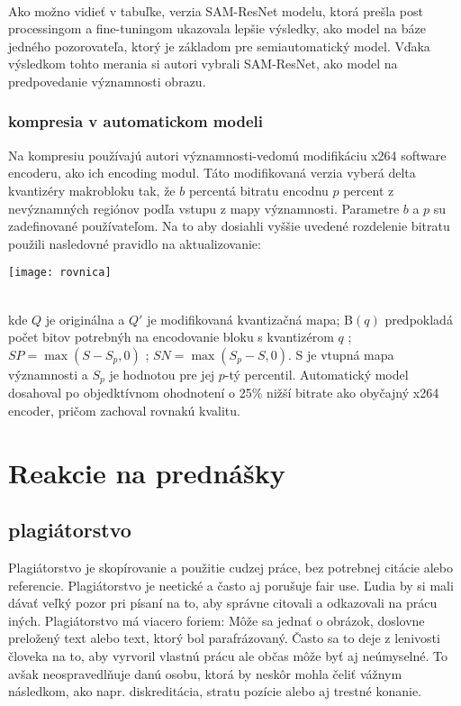 \documentclass[10pt,twoside,slovak,a4paper]{article}
\begin{document}
\\
Ako možno vidieť v tabuľke, verzia SAM-ResNet modelu, ktorá prešla post processingom a fine-tuningom ukazovala lepšie výsledky, ako model na báze jedného pozorovateľa, ktorý je základom pre semiautomatický model. Vďaka výsledkom tohto merania si autori\cite{Czarnecki:Progress} vybrali SAM-ResNet, ako model na predpovedanie významnosti obrazu.
\subsubsection{kompresia v automatickom modeli}
Na kompresiu používajú autori\cite{Czarnecki:Progress} významnosti-vedomú modifikáciu x264 software encoderu, ako ich encoding modul. Táto modifikovaná verzia vyberá delta kvantizéry makrobloku tak, že \(b\) percentá bitratu encodnu \(p\) percent z nevýznamných regiónov podľa vstupu z mapy významnosti. Parametre \(b\) a \(p\) su zadefinované používateľom. Na to aby dosiahli vyššie uvedené rozdelenie bitratu použili nasledovné pravidlo na aktualizovanie:
\begin{figure*}[tbh]
\centering
\texttt{[image: rovnica]}
\label{f:rovnica}
\end{figure*}
\\
kde \(Q\) je originálna a \({Q}'\) je modifikovaná kvantizačná mapa; B\((q)\) predpokladá počet bitov potrebnýh na encodovanie bloku s kvantizérom \(q\) ; \(SP = \max(S - S_{p}, 0)\) ; \(SN = \max(S_{p} - S, 0)\). S je vtupná mapa významnosti a \(S_{p}\) je hodnotou pre jej \(p\)-tý percentil. Automatický model dosahoval po objedktívnom ohodnotení o 25\% nižší bitrate ako obyčajný x264 encoder, pričom zachoval rovnakú kvalitu. 
\section{Reakcie na prednášky}
\subsection{plagiátorstvo}
Plagiátorstvo je skopírovanie a použitie cudzej práce, bez potrebnej citácie alebo referencie. Plagiátorstvo je neetické a často aj porušuje fair use. Ľudia by si mali dávať veľký pozor pri písaní na to, aby správne citovali a odkazovali na prácu iných. Plagiátorstvo má viacero foriem: Môže sa jednať o obrázok, doslovne preložený text alebo text, ktorý bol parafrázovaný. Často sa to deje z lenivosti človeka na to, aby vyrvoril vlastnú prácu ale občas môže byť aj neúmyselné. To avšak neospravedlňuje danú osobu, ktorá by neskôr mohla čeliť vážnym následkom, ako napr. diskreditácia, stratu pozície alebo aj trestné konanie.
\end{document}
